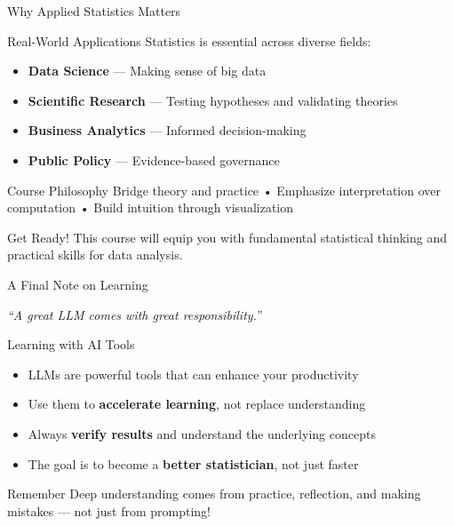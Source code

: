 
\begin{frame}{Why Applied Statistics Matters}
  \begin{block}{Real-World Applications}
    Statistics is essential across diverse fields:
    \begin{itemize}
      \item \textbf{Data Science} — Making sense of big data
      \item \textbf{Scientific Research} — Testing hypotheses and validating theories
      \item \textbf{Business Analytics} — Informed decision-making
      \item \textbf{Public Policy} — Evidence-based governance
    \end{itemize}
  \end{block}

  \begin{block}{Course Philosophy}
    Bridge theory and practice • Emphasize interpretation over computation • Build intuition through visualization
  \end{block}

  \begin{alertblock}{Get Ready!}
    This course will equip you with fundamental statistical thinking and practical skills for data analysis.
  \end{alertblock}
\end{frame}

\begin{frame}{A Final Note on Learning}
  \begin{center}
    \Large
    \textit{``A great LLM comes with great responsibility.''}
  \end{center}

  \vspace{1em}

  \begin{block}{Learning with AI Tools}
    \begin{itemize}
      \item LLMs are powerful tools that can enhance your productivity
      \item Use them to \textbf{accelerate learning}, not replace understanding
      \item Always \textbf{verify results} and understand the underlying concepts
      \item The goal is to become a \textbf{better statistician}, not just faster
    \end{itemize}
  \end{block}

  \begin{alertblock}{Remember}
    Deep understanding comes from practice, reflection, and making mistakes — not just from prompting!
  \end{alertblock}
\end{frame}
